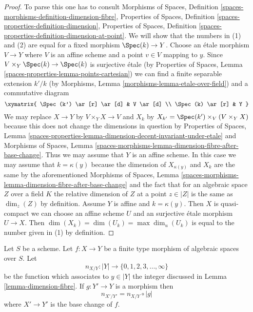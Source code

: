 \begin{proof}
To parse this one has to consult
Morphisms of Spaces, Definition
\ref{spaces-morphisms-definition-dimension-fibre},
Properties of Spaces,
Definition \ref{spaces-properties-definition-dimension},
Properties of Spaces,
Definition \ref{spaces-properties-definition-dimension-at-point}.
We will show that the numbers in (1) and (2) are equal for
a fixed morphism $\Spec(k) \to Y$.
Choose an \'etale morphism $V \to Y$ where $V$ is an affine
scheme and a point $v \in V$ mapping to $y$.
Since $V \times_Y \Spec(k) \to \Spec(k)$ is surjective \'etale
(by Properties of Spaces, Lemma \ref{spaces-properties-lemma-points-cartesian})
we can find a finite separable extension $k'/k$
(by Morphisms, Lemma \ref{morphisms-lemma-etale-over-field})
and a commutative diagram
$$
\xymatrix{
\Spec(k') \ar[r] \ar[d] & V \ar[d] \\
\Spec(k) \ar[r] & Y
}
$$
We may replace $X \to Y$ by $V \times_Y X \to V$ and
$X_k$ by $X_{k'} = \Spec(k') \times_V (V \times_Y X)$
because this does not change the dimensions in question by
Properties of Spaces, Lemma
\ref{spaces-properties-lemma-dimension-decent-invariant-under-etale}
and Morphisms of Spaces, Lemma
\ref{spaces-morphisms-lemma-dimension-fibre-after-base-change}.
Thus we may assume that $Y$ is an affine scheme.
In this case we may assume that $k = \kappa(y)$
because the dimension of $X_{\kappa(y)}$ and $X_k$
are the same by the aforementioned Morphisms of Spaces, Lemma
\ref{spaces-morphisms-lemma-dimension-fibre-after-base-change}
and the fact that for an algebraic space $Z$ over a field $K$ the
relative dimension of $Z$ at a point $z \in |Z|$
is the same as $\dim_z(Z)$ by definition.
Assume $Y$ is affine and $k = \kappa(y)$. Then
$X$ is quasi-compact we can choose an affine scheme $U$ and
an surjective \'etale morphism $U \to X$.
Then $\dim(X_k) = \dim(U_k) = \max \dim_u(U_k)$
is equal to the number given in (1) by definition.
\end{proof}

\begin{lemma}
\label{lemma-base-change-dimension-fibres}
Let $S$ be a scheme. Let $f : X \to Y$ be a finite type morphism of
algebraic spaces over $S$. Let
$$
n_{X/Y} : |Y| \to \{0, 1, 2, 3, \ldots, \infty\}
$$
be the function which associates to $y \in |Y|$ the
integer discussed in Lemma \ref{lemma-dimension-fibre}.
If $g : Y' \to Y$ is a morphism then
$$
n_{X'/Y'} = n_{X/Y} \circ |g|
$$
where $X' \to Y'$ is the base change of $f$.
\end{lemma}

